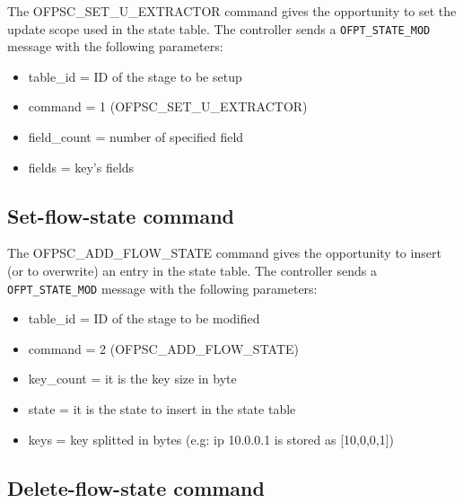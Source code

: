 The OFPSC\_SET\_U\_EXTRACTOR command gives the opportunity to set the update scope used in the state table.
The controller sends a \texttt{OFPT\_STATE\_MOD} message with the following parameters:

\begin{itemize}
\item table\_id = ID of the stage to be setup
\item command = 1 (OFPSC\_SET\_U\_EXTRACTOR)
\item field\_count = number of specified field 
\item fields = key’s fields
\end{itemize}


\subsection{Set-flow-state command}
\label{subsec:add_flow}

The OFPSC\_ADD\_FLOW\_STATE command gives the opportunity to insert (or to overwrite) an entry in the state table.
The controller sends a \texttt{OFPT\_STATE\_MOD} message with the following parameters:

\begin{itemize}
\item table\_id = ID of the stage to be modified
\item command = 2 (OFPSC\_ADD\_FLOW\_STATE)
\item key\_count = it is the key size in byte
\item state = it is the state to insert in the state table
\item keys = key splitted in bytes (e.g: ip 10.0.0.1 is stored as [10,0,0,1])
\end{itemize}



\subsection{Delete-flow-state command}
\label{subsec:del_flow}

